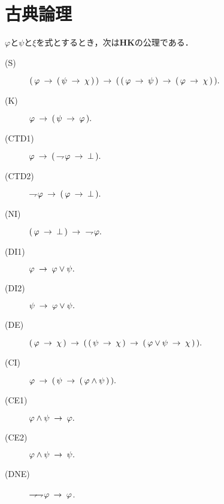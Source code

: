 \section{古典論理}
	\begin{screen}
		\begin{logicalaxm}
			$\varphi$と$\psi$と$\xi$を式とするとき，次は{\bf HK}の公理である．
			\begin{description}
				\item[(S)] $(\, \varphi \rarrow (\, \psi \rarrow \chi\, )\, ) 
					\rarrow (\, (\, \varphi \rarrow \psi\, )
					\rarrow (\, \varphi \rarrow \chi\, )\, ).$
				\item[(K)] $\varphi \rarrow (\, \psi \rarrow \varphi\, ).$
				\item[(CTD1)] $\varphi \rarrow (\, \negation \varphi \rarrow \bot\, ).$
				\item[(CTD2)] $\negation \varphi \rarrow (\, \varphi \rarrow \bot\, ).$
				\item[(NI)] $(\, \varphi \rarrow \bot\, ) \rarrow\ \negation \varphi.$
				\item[(DI1)] $\varphi \rarrow \varphi \vee \psi.$
				\item[(DI2)] $\psi \rarrow \varphi \vee \psi.$
				\item[(DE)] $(\, \varphi \rarrow \chi\, ) \rarrow 
					(\, (\, \psi \rarrow \chi\, ) 
					\rarrow (\, \varphi \vee \psi \rarrow \chi\, )\, ).$
				\item[(CI)] $\varphi \rarrow (\, \psi \rarrow (\, \varphi \wedge \psi\, )\, ).$
				\item[(CE1)] $\varphi \wedge \psi \rarrow \varphi.$
				\item[(CE2)] $\varphi \wedge \psi \rarrow \psi.$
				\item[(DNE)] $\negation \negation \varphi \rarrow \varphi$.
			\end{description}
		\end{logicalaxm}
	\end{screen}
	
